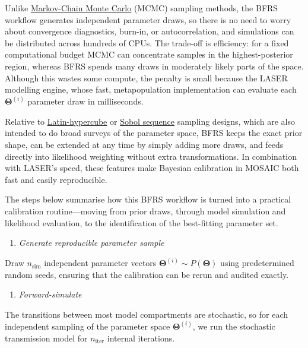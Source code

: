 \documentclass[
]{book}
\providecommand{\tightlist}{%
  \setlength{\itemsep}{0pt}\setlength{\parskip}{0pt}}
\begin{document}
Unlike \href{https://en.wikipedia.org/wiki/Markov_chain_Monte_Carlo}{Markov-Chain Monte Carlo} (MCMC) sampling methods, the BFRS workflow generates independent parameter draws, so there is no need to worry about convergence diagnostics, burn-in, or autocorrelation, and simulations can be distributed across hundreds of CPUs. The trade-off is efficiency: for a fixed computational budget MCMC can concentrate samples in the highest-posterior region, whereas BFRS spends many draws in moderately likely parts of the space. Although this wastes some compute, the penalty is small because the LASER modelling engine, whose fast, metapopulation implementation can evaluate each \(\boldsymbol{\Theta}^{(i)}\) parameter draw in milliseconds.

Relative to \href{https://en.wikipedia.org/wiki/Latin_hypercube_sampling\#:~:text=Thus\%2C\%20orthogonal\%20sampling\%20ensures\%20that,of\%20random\%20numbers\%20without\%20any}{Latin-hypercube} or \href{https://en.wikipedia.org/wiki/Sobol_sequence}{Sobol sequence} sampling designs, which are also intended to do broad surveys of the parameter space, BFRS keeps the exact prior shape, can be extended at any time by simply adding more draws, and feeds directly into likelihood weighting without extra transformations. In combination with LASER's speed, these features make Bayesian calibration in MOSAIC both fast and easily reproducible.

The steps below summarise how this BFRS workflow is turned into a practical calibration routine---moving from prior draws, through model simulation and likelihood evaluation, to the identification of the best-fitting parameter set.

\begin{enumerate}
\def\labelenumi{\arabic{enumi}.}
\tightlist
\item
  \emph{Generate reproducible parameter sample}
\end{enumerate}

Draw \(n_{\text{sim}}\) independent parameter vectors \(\boldsymbol{\Theta}^{(i)} \sim P(\boldsymbol{\Theta})\) using predetermined random seeds, ensuring that the calibration can be rerun and audited exactly.

\begin{enumerate}
\def\labelenumi{\arabic{enumi}.}
\setcounter{enumi}{1}
\tightlist
\item
  \emph{Forward-simulate}
\end{enumerate}

The transitions between most model compartments are stochastic, so for each independent sampling of the parameter space \(\boldsymbol{\Theta}^{(i)}\), we run the stochastic transmission model for \(n_{\text{iter}}\) internal iterations.
\end{document}
